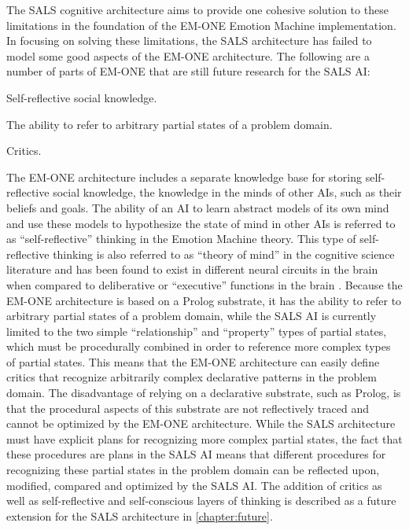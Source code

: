 The SALS cognitive architecture aims to provide one cohesive solution
to these limitations in the foundation of the EM-ONE Emotion Machine
implementation.  In focusing on solving these limitations, the SALS
architecture has failed to model some good aspects of the EM-ONE
architecture.  The following are a number of parts of EM-ONE that are
still future research for the SALS AI:
\begin{packed_enumerate}
\item{Self-reflective social knowledge.}
\item{The ability to refer to arbitrary partial states of a problem
  domain.}
\item{Critics.}
\end{packed_enumerate}
The EM-ONE architecture includes a separate knowledge base for storing
self-reflective social knowledge, the knowledge in the minds of other
AIs, such as their beliefs and goals.  The ability of an AI to learn
abstract models of its own mind and use these models to hypothesize
the state of mind in other AIs is referred to as ``self-reflective''
thinking in the Emotion Machine theory.  This type of self-reflective
thinking is also referred to as ``theory of mind'' in the cognitive
science literature and has been found to exist in different neural
circuits in the brain when compared to deliberative or ``executive''
functions in the brain \cite[]{saxe:2006}.  Because the EM-ONE
architecture is based on a Prolog substrate, it has the ability to
refer to arbitrary partial states of a problem domain, while the SALS
AI is currently limited to the two simple ``relationship'' and
``property'' types of partial states, which must be procedurally
combined in order to reference more complex types of partial states.
This means that the EM-ONE architecture can easily define critics that
recognize arbitrarily complex declarative patterns in the problem
domain.  The disadvantage of relying on a declarative substrate, such
as Prolog, is that the procedural aspects of this substrate are not
reflectively traced and cannot be optimized by the EM-ONE
architecture.  While the SALS architecture must have explicit plans
for recognizing more complex partial states, the fact that these
procedures are plans in the SALS AI means that different procedures
for recognizing these partial states in the problem domain can be
reflected upon, modified, compared and optimized by the SALS AI.  The
addition of critics as well as self-reflective and self-conscious
layers of thinking is described as a future extension for the SALS
architecture in {\mbox{\autoref{chapter:future}}}.

